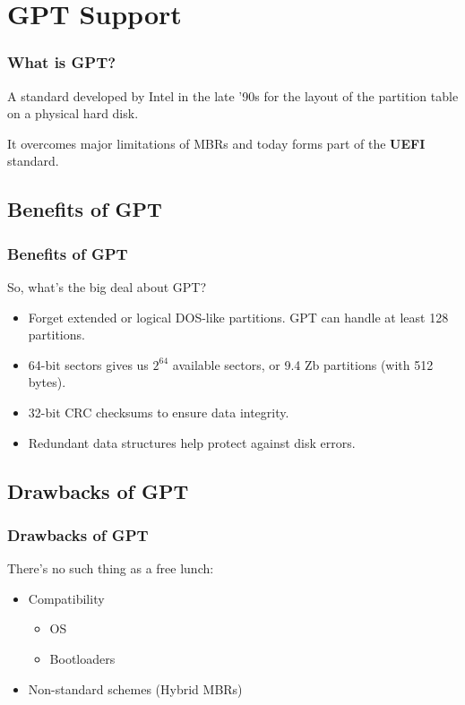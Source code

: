 
\section{GPT Support}
\begin{frame}\frametitle{What is GPT?}
  A standard developed by Intel in the late '90s for the layout of the partition table on a physical hard disk.\newline

  It overcomes major limitations of MBRs and today forms part of the \textbf{UEFI} standard.
\end{frame}

\subsection{Benefits of GPT}
\begin{frame}\frametitle{Benefits of GPT}
  So, what's the big deal about GPT?
  \begin{itemize}
  \item Forget extended or logical DOS-like partitions. GPT can handle at least 128 partitions.
  \item 64-bit sectors gives us $2^{64}$ available sectors, or 9.4 Zb partitions (with 512 bytes).
  \item 32-bit CRC checksums to ensure data integrity.
  \item Redundant data structures help protect against disk errors.
  \end{itemize}
\end{frame}

\subsection{Drawbacks of GPT}
\begin{frame}\frametitle{Drawbacks of GPT}
  There's no such thing as a free lunch:
  \begin{itemize}
  \item Compatibility
    \begin{itemize}
    \item OS
    \item Bootloaders
    \end{itemize}
  \item Non-standard schemes (Hybrid MBRs)
  \end{itemize}
\end{frame}
